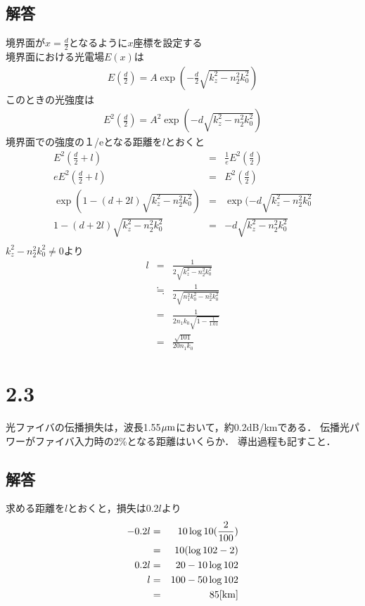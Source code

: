 \subsection*{解答}
\noindent
境界面が$x=\frac{d}{2}$となるように$x$座標を設定する\\
境界面における光電場$E(x)$は
\begin{eqnarray*}
    E(\frac{d}{2})=A\exp(-\frac{d}{2}\sqrt{k_z^2-n_2^2k_0^2})
\end{eqnarray*}
このときの光強度は
\begin{eqnarray*}
    E^2(\frac{d}{2})=A^2\exp(-d\sqrt{k_z^2-n_2^2k_0^2})
\end{eqnarray*}
境界面での強度の１/eとなる距離を$l$とおくと
\begin{eqnarray*}
    E^2(\frac{d}{2}+l)&=&\frac{1}{e}E^2(\frac{d}{2})\\
    eE^2(\frac{d}{2}+l)&=&E^2(\frac{d}{2})\\
    \exp(1-(d+2l)\sqrt{k_z^2-n_2^2k_0^2})&=&\exp(-d\sqrt{k_z^2-n_2^2k_0^2}\\
    1-(d+2l)\sqrt{k_z^2-n_2^2k_0^2}&=&-d\sqrt{k_z^2-n_2^2k_0^2}\\
\end{eqnarray*}
$k_z^2-n_2^2k_0^2 \neq 0$より
\begin{eqnarray*}
    l&=&\frac{1}{2\sqrt{k_z^2-n_2^2k_0^2}}\\
    &\fallingdotseq&\frac{1}{2\sqrt{n_1^2k_0^2-n_2^2k_0^2}}\\
    &=&\frac{1}{2n_1k_0\sqrt{1-\frac{1}{1.01}}}\\
    &=&\frac{\sqrt{101}}{20n_1k_0}
\end{eqnarray*}

\section*{2.3}
光ファイバの伝播損失は，波長1.55${\rm \mu m}$において，約0.2dB/kmである．
伝播光パワーがファイバ入力時の2\%となる距離はいくらか．
導出過程も記すこと．

\subsection*{解答}
\noindent
求める距離を$l$とおくと，損失は0.2$l$より
\begin{eqnarray*}
    -0.2l&=&10\log{10}(\frac{2}{100})\\
    &=&10(\log{10}2-2)\\
    0.2l&=&20-10\log{10}2\\
    l&=&100-50\log{10}2\\
    &=&85[{\rm km}]
\end{eqnarray*}

